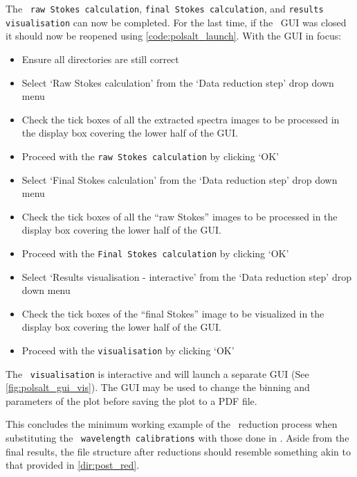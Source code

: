 The \polsalt\ \texttt{raw Stokes calculation}, \texttt{final Stokes calculation}, and \texttt{results visualisation} can now be completed. For the last time, if the \polsalt\ \gls{GUI} was closed it should now be reopened using \autoref{code:polsalt_launch}. With the \gls{GUI} in focus:
\begin{itemize}
    \item Ensure all directories are still correct
    \item Select `Raw Stokes calculation' from the `Data reduction step' drop down menu
    \item Check the tick boxes of all the extracted spectra images to be processed in the display box covering the lower half of the \gls{GUI}.
    \item Proceed with the \texttt{raw Stokes calculation} by clicking `OK'
    \item Select `Final Stokes calculation' from the `Data reduction step' drop down menu
    \item Check the tick boxes of all the ``raw Stokes'' images to be processed in the display box covering the lower half of the \gls{GUI}.
    \item Proceed with the \texttt{Final Stokes calculation} by clicking `OK'
    \item Select `Results visualisation - interactive' from the `Data reduction step' drop down menu
    \item Check the tick boxes of the ``final Stokes'' image to be visualized in the display box covering the lower half of the \gls{GUI}.
    \item Proceed with the \texttt{visualisation} by clicking `OK'
\end{itemize}

The \polsalt\ \texttt{visualisation} is interactive and will launch a separate \gls{GUI} (See \autoref{fig:polsalt_gui_vis}). The \gls{GUI} may be used to change the binning and parameters of the plot before saving the plot to a PDF file.

This concludes the minimum working example of the \polsalt\ reduction process when substituting the \polsalt\ \texttt{wavelength calibrations} with those done in \iraf. Aside from the final results, the file structure after reductions should resemble something akin to that provided in \autoref{dir:post_red}.

